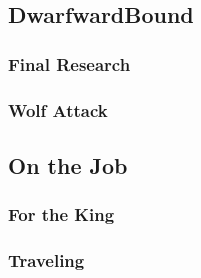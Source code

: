 

\subsection{DwarfwardBound}


\subsubsection{Final Research}


\subsubsection{Wolf Attack}


\subsection{On the Job}


\subsubsection{For the King}


\subsubsection{Traveling}


